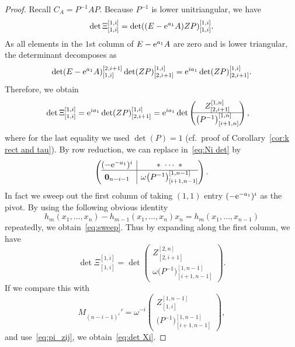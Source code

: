 \documentclass[pdftex]{sigma}
\numberwithin{equation}{section}
\newcommand{\bm}[1]{\mbox{\boldmath{$#1$}}}
\theoremstyle{definition}
\begin{document}
\begin{proof}
Recall $C_A=P^{-1}AP$.
Because $P^{-1}$ is lower unitriangular, we have
\[
\det\Xi^{[1,i]}_{[1,i]}
=
\det((E-{\rm e}^{a_1}A)ZP)_{[1,i]}^{[1,i]}.
\]
As all elements in the $1$st column of $E-{\rm e}^{a_1}A$ are zero and  is lower triangular, the determinant  decomposes as
\[
\det(E-{\rm e}^{a_1}A)^{[2,i+1]}_{[1,i]}\det(ZP)_{[2,i+1]}^{[1,i]}
={\rm e}^{ia_1}\det(ZP)_{[2,i+1]}^{[1,i]}.
\]
Therefore, we obtain
\begin{align}
\det\Xi^{[1,i]}_{[1,i]}
&={\rm e}^{ia_1}\det(ZP)_{[2,i+1]}^{[1,i]}
={\rm e}^{ia_1}\det\left(
\begin{matrix}
Z_{[2,i+1]}^{[1,n]} \\\hline
\bigl(P^{-1}\bigr)_{[i+1,n]}^{[1,n]}
\end{matrix}
\right), \label{eq:Ni det}
\end{align}
where for the last equality we used $\det(P)=1$ (cf.\ proof of Corollary~\ref{cor:k rect and tau}).
By row reduction, we can replace  in~\eqref{eq:Ni det} by
\begin{equation}
\left(
\begin{array}{@{}c|c@{}}
 (-{\rm e}^{-a_1})^{i} &\ast\ \cdots\ \ast \\\hline
 \bm{0}_{n-i-1} & \omega\bigl(P^{-1}\bigr)_{[i+1,n-1]}^{[1,n-1]}
\end{array}
\right).
\label{eq:sweep}
\end{equation}
In fact we sweep out the first column of  taking $(1,1)$ entry $(-{\rm e}^{-a_1})^i$ as
the pivot. By using the following obvious identity
\[
h_m(x_1,\dots,x_n)-h_{m-1}(x_1,\dots,x_n)x_n=h_{m}(x_1,\dots,x_{n-1})
\] repeatedly, we obtain~\eqref{eq:sweep}.
Thus by expanding along the first column, we have
\[
\det\Xi^{[1,i]}_{[1,i]}=
\det\left(
\begin{matrix}
Z_{[2,i+1]}^{[2,n]} \\\hline
\omega\bigl(P^{-1}\bigr)_{[i+1,n-1]}^{[1,n-1]}
\end{matrix}
\right).
\]
If we compare this with
\[M_{(n-i-1)^i}'=
\omega^{-i} \left(
\begin{matrix}
Z^{[1,n-1]}_{[1,i]}\\
\hline
\bigl(P^{-1}\bigr)^{[1,n-1]}_{[i+1,n-1]}
\end{matrix}
\right),
\]
and use~\eqref{eq:pi_zij},
we obtain~\eqref{eq:det Xi}.
\end{proof}
\end{document}
